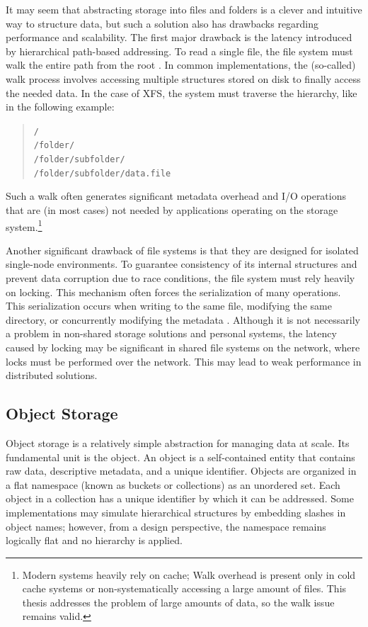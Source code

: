 It may seem that abstracting storage into files and folders is a clever and intuitive way to structure data, but such a solution also has drawbacks regarding performance and scalability. The first major drawback is the latency introduced by hierarchical path-based addressing. To read a single file, the file system must walk the entire path from the root \cite{beaver_finding_2010}. In common implementations, the (so-called) walk process involves accessing multiple structures stored on disk to finally access the needed data. In the case of XFS, the system must traverse the hierarchy, like in the following example:
\begin{quote}
\texttt{/}\\
\texttt{/folder/}\\
\texttt{/folder/subfolder/}\\
\texttt{/folder/subfolder/data.file}
\end{quote}
Such a walk often generates significant metadata overhead and I/O operations that are (in most cases) not needed by applications operating on the storage system.\footnote{Modern systems heavily rely on cache; Walk overhead is present only in cold cache systems or non-systematically accessing a large amount of files. This thesis addresses the problem of large amounts of data, so the walk issue remains valid.} \cite{beaver_finding_2010}

Another significant drawback of file systems is that they are designed for isolated single-node environments. To guarantee consistency of its internal structures and prevent data corruption due to race conditions, the file system must rely heavily on locking. This mechanism often forces the serialization of many operations. This serialization occurs when writing to the same file, modifying the same directory, or concurrently modifying the metadata \cite{yuan_introduction_2020}. Although it is not necessarily a problem in non-shared storage solutions and personal systems, the latency caused by locking may be significant in shared file systems on the network, where locks must be performed over the network. This may lead to weak performance in distributed solutions. \cite{liu_evaluation_2018}

\subsection{Object Storage}
Object storage is a relatively simple abstraction for managing data at scale. Its fundamental unit is the object. An object is a self-contained entity that contains raw data, descriptive metadata, and a unique identifier. Objects are organized in a flat namespace (known as buckets or collections) as an unordered set. Each object in a collection has a unique identifier by which it can be addressed. Some implementations may simulate hierarchical structures by embedding slashes in object names; however, from a design perspective, the namespace remains logically flat and no hierarchy is applied. \cite{mesnier_storage_2003}

